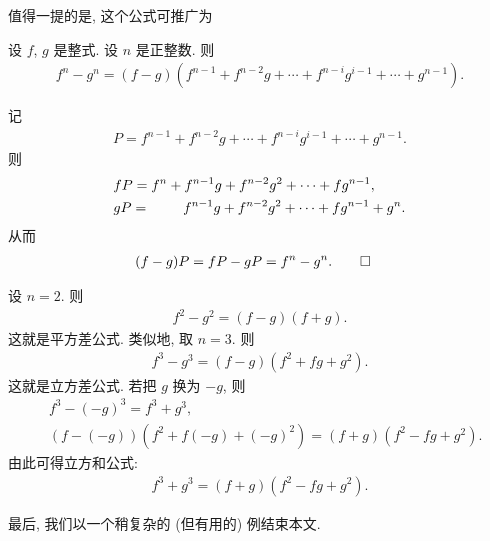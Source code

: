 值得一提的是, 这个公式可推广为
\begin{proposition}
    设 $f$, $g$ 是整式. 设 $n$ 是正整数. 则
    \begin{align*}
        f^n - g^n = (f - g)(f^{n-1} + f^{n-2} g + \cdots + f^{n-i} g^{i-1} + \cdots + g^{n-1}).
    \end{align*}
\end{proposition}

\begin{pf}
    记
    \begin{align*}
        P = f^{n-1} + f^{n-2} g + \cdots + f^{n-i} g^{i-1} + \cdots + g^{n-1}.
    \end{align*}
    则
    \begin{align*}
         & fP = f^n + f^{n-1} g + f^{n-2} g^2 + \cdots + fg^{n-1},                    \\
         & gP = \hphantom{f^n + {}} f^{n-1}g + f^{n-2} g^2 + \cdots + fg^{n-1} + g^n.
    \end{align*}
    从而
    \begin{align*}
         & (f - g)P = fP - gP = f^n - g^n. \qedhere
    \end{align*}
\end{pf}

\begin{example}
    设 $n = 2$. 则
    \begin{align*}
        f^2 - g^2 = (f - g)(f + g).
    \end{align*}
    这就是平方差公式. 类似地, 取 $n = 3$. 则
    \begin{align*}
        f^3 - g^3 = (f - g)(f^2 + fg + g^2).
    \end{align*}
    这就是立方差公式. 若把 $g$ 换为 $-g$, 则
    \begin{align*}
         & f^3 - (-g)^3 = f^3 + g^3,                                   \\
         & (f - (-g))(f^2 + f(-g) + (-g)^2) = (f + g)(f^2 - fg + g^2).
    \end{align*}
    由此可得立方和公式:
    \begin{align*}
        f^3 + g^3 = (f + g)(f^2 - fg + g^2).
    \end{align*}
\end{example}

最后, 我们以一个稍复杂的 (但有用的) 例结束本文.

